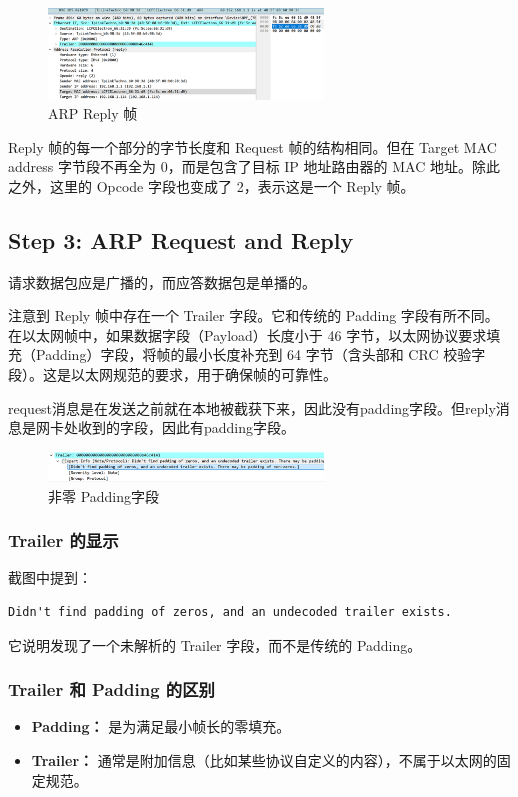 \documentclass[14pt,a4paper,UTF8,twoside]{article}
\begin{document}
\begin{figure}[H]
    \centering
    \includegraphics[width=0.65\textwidth]{lab4/reply.png}
    \caption{ARP Reply 帧}
\end{figure}

Reply 帧的每一个部分的字节长度和 Request 帧的结构相同。但在 Target MAC address
字节段不再全为 0，而是包含了目标 IP 地址路由器的 MAC 地址。除此之外，这里的 Opcode
字段也变成了 2，表示这是一个 Reply 帧。

\subsection{Step 3: ARP Request and Reply}

请求数据包应是广播的，而应答数据包是单播的。

注意到 Reply 帧中存在一个 Trailer 字段。它和传统的 Padding 字段有所不同。在以太网帧中，如果数据字段（Payload）长度小于 46 字节，以太网协议要求填充（Padding）字段，将帧的最小长度补充到 64 字节（含头部和 CRC 校验字段）。这是以太网规范的要求，用于确保帧的可靠性。

request消息是在发送之前就在本地被截获下来，因此没有padding字段。但reply消息是网卡处收到的字段，因此有padding字段。

\begin{figure}[H]
    \centering
    \includegraphics[width=0.65\textwidth]{lab4/nonzero.png}
    \caption{非零 Padding字段}
\end{figure}

\subsubsection{Trailer 的显示}
截图中提到：

\begin{lstlisting}
Didn't find padding of zeros, and an undecoded trailer exists.
\end{lstlisting}

它说明发现了一个未解析的 Trailer 字段，而不是传统的 Padding。

\subsubsection{Trailer 和 Padding 的区别}
\begin{itemize}[leftmargin=1.5em]
    \item \textbf{Padding：} 是为满足最小帧长的零填充。
    \item \textbf{Trailer：} 通常是附加信息（比如某些协议自定义的内容），不属于以太网的固定规范。
\end{itemize}
\end{document}
